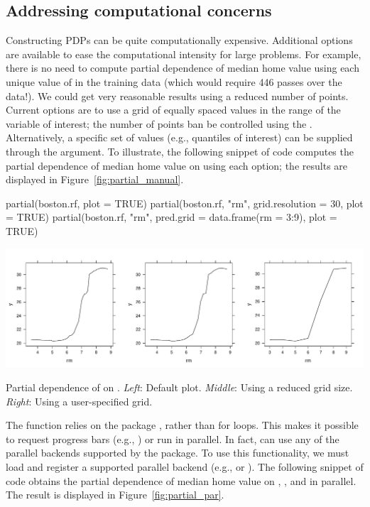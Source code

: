 \subsection{Addressing computational concerns}

Constructing PDPs can be quite computationally expensive. Additional options are available to ease the computational intensity for large problems. For example, there is no need to compute partial dependence of median home value using each unique value of  in the training data (which would require 446 passes over the data!). We could get very reasonable results using a reduced number of points. Current options are to use a grid of equally spaced values in the range of the variable of interest; the number of points ban be controlled using the . Alternatively, a specific set of values (e.g., quantiles of interest) can be supplied through the  argument. To illustrate, the following snippet of code computes the partial dependence of median home value on  using each option; the results are displayed in Figure~\ref{fig:partial_manual}.
\begin{example}
partial(boston.rf, plot = TRUE)
partial(boston.rf, "rm", grid.resolution = 30, plot = TRUE)
partial(boston.rf, "rm", pred.grid = data.frame(rm = 3:9), plot = TRUE)
\end{example}

\begin{widefigure}[htbp]
  \centering
  \includegraphics[width=0.8\linewidth]{partial_manual}
  \caption{Partial dependence of  on . \textit{Left}: Default plot. \textit{Middle}: Using a reduced grid size. \textit{Right}: Using a user-specified grid.}
  \label{fig:partial_manual}
\end{widefigure}

The  function relies on the  package \citep{plyr-pkg}, rather than for loops. This makes it possible to request progress bars (e.g., ) or run  in parallel. In fact,  can use any of the parallel backends supported by the  package. To use this functionality, we must load and register a supported parallel backend (e.g.,  \citep{doMC-pkg} or  \citep{doParallel-pkg}). The following snippet of code obtains the partial dependence of median home value on , , and  in parallel. The result is displayed in Figure~\ref{fig:partial_par}.


